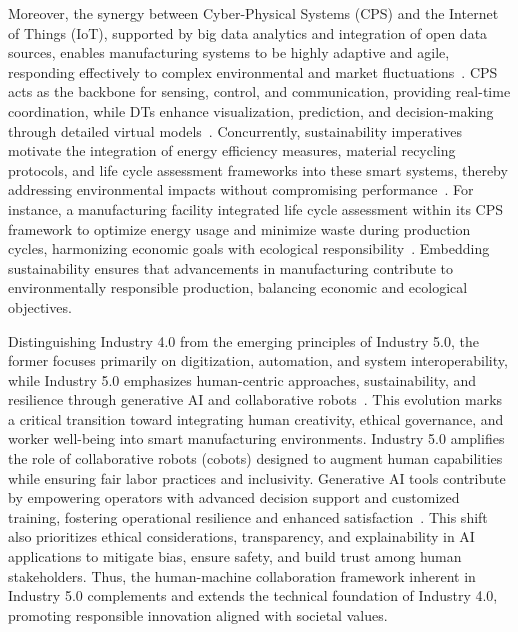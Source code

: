 \documentclass[sigconf]{acmart}
\begin{document}
Moreover, the synergy between Cyber-Physical Systems (CPS) and the Internet of Things (IoT), supported by big data analytics and integration of open data sources, enables manufacturing systems to be highly adaptive and agile, responding effectively to complex environmental and market fluctuations~\cite{ref9,ref20,ref22}. CPS acts as the backbone for sensing, control, and communication, providing real-time coordination, while DTs enhance visualization, prediction, and decision-making through detailed virtual models~\cite{ref22}. Concurrently, sustainability imperatives motivate the integration of energy efficiency measures, material recycling protocols, and life cycle assessment frameworks into these smart systems, thereby addressing environmental impacts without compromising performance~\cite{ref38,ref41}. For instance, a manufacturing facility integrated life cycle assessment within its CPS framework to optimize energy usage and minimize waste during production cycles, harmonizing economic goals with ecological responsibility~\cite{ref41}. Embedding sustainability ensures that advancements in manufacturing contribute to environmentally responsible production, balancing economic and ecological objectives.

Distinguishing Industry 4.0 from the emerging principles of Industry 5.0, the former focuses primarily on digitization, automation, and system interoperability, while Industry 5.0 emphasizes human-centric approaches, sustainability, and resilience through generative AI and collaborative robots~\cite{ref6}. This evolution marks a critical transition toward integrating human creativity, ethical governance, and worker well-being into smart manufacturing environments. Industry 5.0 amplifies the role of collaborative robots (cobots) designed to augment human capabilities while ensuring fair labor practices and inclusivity. Generative AI tools contribute by empowering operators with advanced decision support and customized training, fostering operational resilience and enhanced satisfaction~\cite{ref6}. This shift also prioritizes ethical considerations, transparency, and explainability in AI applications to mitigate bias, ensure safety, and build trust among human stakeholders. Thus, the human-machine collaboration framework inherent in Industry 5.0 complements and extends the technical foundation of Industry 4.0, promoting responsible innovation aligned with societal values.
\end{document}
